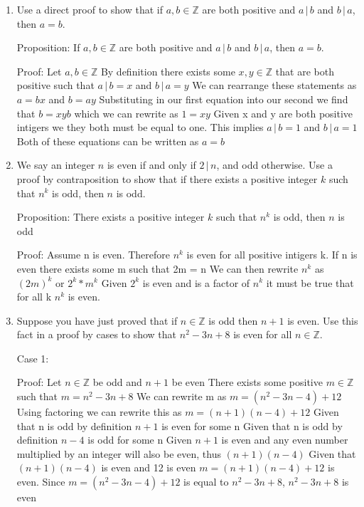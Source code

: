 \documentclass{article}
\newcommand{\bZ}{\mathbb{Z}}
\begin{document}
{\begin{enumerate}[labelindent=0pt,leftmargin=0pt]
\item Use a direct proof to show that if $a,b\in\bZ$ are both positive
and $a\,|\,b$ and $b\,|\,a$, then $a=b$.

Proposition: If $a,b\in\bZ$ are both positive and $a\,|\,b$ and $b\,|\,a$, then $a=b$.

Proof: Let $a,b\in\bZ$ 
By definition there exists some $x,y\in\bZ$ that are both positive such that $a\,|\,b = x$ and $b\,|\,a = y$
We can rearrange these statements as $a = bx$ and $b = ay$
Substituting in our first equation into our second we find that $b = xyb$ which we can rewrite as $1 = xy$ Given x and y are both positive intigers we they both must be equal to one. 
This implies $a\,|\,b = 1$ and $b\,|\,a = 1$
Both of these equations can be written as $a = b$

\item We say an integer $n$ is even if and only if $2\,|\,n$, and odd
otherwise. Use a proof by contraposition to show that if there exists a
positive integer $k$ such that $n^k$ is odd, then $n$ is odd.

Proposition: There exists a positive integer $k$ such that $n^k$ is odd, then $n$ is odd

Proof: Assume n is even. Therefore $n^k$ is even for all positive intigers k.
If n is even there exists some m such that 2m = n
We can then rewrite $n^k$ as $(2m)^k$ or $2^k * m^k$
Given $2^k$ is even and is a factor of $n^k$ it must be true that for  all  k $n^k$ is even. 


\item Suppose you have just proved that if $n\in\bZ$ is odd then $n+1$
is even. Use this fact in a proof by cases to show that $n^2-3n+8$ is even
for all $n\in\bZ$.

\vspace{10pt}

Case 1:

Proof: Let $n\in\bZ$ be odd and $n+1$ be even
There exists some positive $m\in\bZ$ such that $ m = n^2-3n+8$ 
We can rewrite m as $m = (n^2-3n-4)+12$ 
Using factoring we can rewrite this as $m = (n+1)(n-4)+12$
Given that n is odd by definition $n+1$ is even for some n
Given that n is odd by definition $n-4$ is odd for some n
Given $n+1$ is even and any even number multiplied by an integer will also be even, thus $(n+1)(n-4)$
Given that $(n+1)(n-4)$ is even and 12 is even $m = (n+1)(n-4)+12$ is even.
Since $m = (n^2-3n-4)+12$ is equal to $n^2-3n+8$,  $n^2-3n+8$ is even 

\vspace{10pt}


\end{enumerate}}
\end{document}
